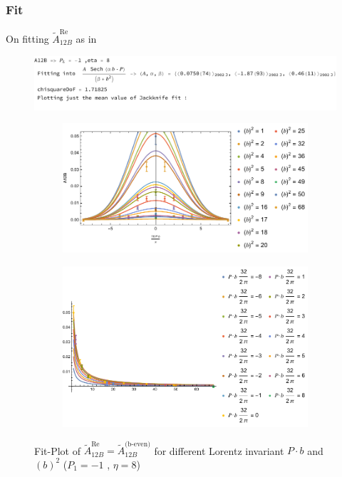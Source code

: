 \documentclass[]{article}
\numberwithin{equation}{section}
\newcommand{\tAmp}{\widetilde{A}}
\newcommand{\tAmp}{\ensuremath{\widetilde{A}^{(+)}}}
\begin{document}
\subsubsection{Fit}
On fitting $\tAmp_{12B}^{\text{Re}}$ as in
\begin{figure}[h!]
    \centering
    \includegraphics[width=0.8\linewidth]{fitA12B.pdf}
\end{figure}
\begin{figure}[h!]
     \centering
     \begin{subfigure}[b]{0.45\textwidth}
         \centering
         \includegraphics[width=\textwidth]{Pbfit_A12B_b_bnum_P1_-1_eta_8.pdf}
     \end{subfigure}
     \begin{subfigure}[b]{0.45\textwidth}
         \centering
         \includegraphics[width=\textwidth]{bsqfit_A12B_b_bnum_P1_-1_eta_8.pdf}
     \end{subfigure}
        \caption{Fit-Plot of $\tAmp^{\text{Re}}_{12B}=\tAmp^{\text{(b-even)}}_{12B}$ for different Lorentz invariant $P\cdot b$ and $(b)^2$  ($P_{1} = -1$ , $\eta=8$)}
\end{figure}
\end{document}
